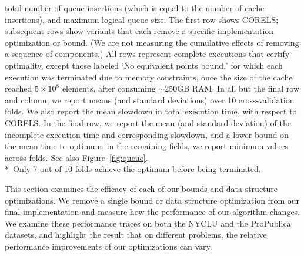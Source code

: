 \begin{table}[t!]
{total number of queue insertions (which is equal to the number of cache insertions),
and maximum logical queue size.
%
The first row shows CORELS; subsequent rows show variants
that each remove a specific implementation optimization or bound.
%
(We are not measuring the cumulative effects of removing a sequence of components.)
%
All rows represent complete executions that certify optimality,
except those labeled `No equivalent points bound,'
for which each execution was terminated due to memory constraints,
once the size of the cache reached ${5 \times 10^8}$ elements,
after consuming $\sim$250GB RAM.
%
In all but the final row and column, we report means
(and standard deviations) over 10 cross-validation folds.
%
We also report the  mean slowdown in total execution time,
with respect to CORELS.
%
In the final row, we report the mean (and standard deviation) of the
incomplete execution time and corresponding slowdown,
and a lower bound on the mean time to optimum;
in the remaining fields, we report minimum values across folds.
%
See also Figure~\ref{fig:queue}. \\
%
*~Only 7 out of 10 folds achieve the optimum before being terminated.
}
\vspace{4mm}
\label{tab:ablation}
\end{table}

This section examines the efficacy of each of our bounds and data structure optimizations.
%
We remove a single bound or data structure optimization from our final implementation and measure
how the performance of our algorithm changes.
%
We examine these performance traces on both the NYCLU and the ProPublica datasets,
and highlight the result that on different problems, the relative performance improvements
of our optimizations can vary.

